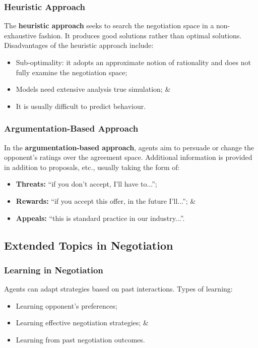 \documentclass[a4paper,11pt]{article}
\begin{document}
\subsubsection{Heuristic Approach}
The \textbf{heuristic approach} seeks to search the negotiation space in a non-exhaustive fashion.
It produces good solutions rather than optimal solutions.
Disadvantages of the heuristic approach include:
\begin{itemize}
    \item   Sub-optimality: it adopts an approximate notion of rationality and does not fully examine the negotiation space;
    \item   Models need extensive analysis true simulation; \&
    \item   It is usually difficult to predict behaviour.
\end{itemize}

\subsubsection{Argumentation-Based Approach}
In the \textbf{argumentation-based approach}, agents aim to persuade or change the opponent's ratings over the agreement space.
Additional information is provided in addition to proposals, etc., usually taking the form of:
\begin{itemize}
    \item   \textbf{Threats:} ``if you don't accept, I'll have to...'';
    \item   \textbf{Rewards:} ``if you accept this offer, in the future I'll...''; \&
    \item   \textbf{Appeals:} ``this is standard practice in our industry...''.
\end{itemize}

\subsection{Extended Topics in Negotiation}
\subsubsection{Learning in Negotiation}
Agents can adapt strategies based on past interactions.
Types of learning:
\begin{itemize}
    \item   Learning opponent's preferences;
    \item   Learning effective negotiation strategies; \&
    \item   Learning from past negotiation outcomes.
\end{itemize}
\end{document}
